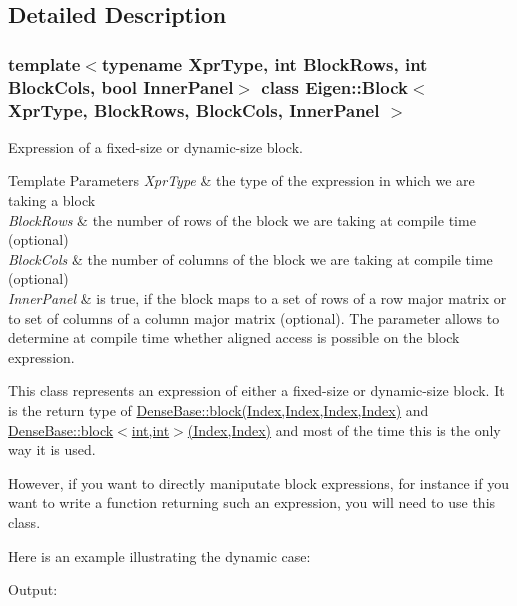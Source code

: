 \subsection{Detailed Description}
\subsubsection*{template$<$typename Xpr\+Type, int Block\+Rows, int Block\+Cols, bool Inner\+Panel$>$\newline
class Eigen\+::\+Block$<$ Xpr\+Type, Block\+Rows, Block\+Cols, Inner\+Panel $>$}

Expression of a fixed-\/size or dynamic-\/size block. 


\begin{DoxyTemplParams}{Template Parameters}
{\em Xpr\+Type} & the type of the expression in which we are taking a block \\
\hline
{\em Block\+Rows} & the number of rows of the block we are taking at compile time (optional) \\
\hline
{\em Block\+Cols} & the number of columns of the block we are taking at compile time (optional) \\
\hline
{\em Inner\+Panel} & is true, if the block maps to a set of rows of a row major matrix or to set of columns of a column major matrix (optional). The parameter allows to determine at compile time whether aligned access is possible on the block expression.\\
\hline
\end{DoxyTemplParams}
This class represents an expression of either a fixed-\/size or dynamic-\/size block. It is the return type of \mbox{\hyperlink{class_eigen_1_1_dense_base_ab8e42e67c5cfd5fa13e684642f0f65bf}{Dense\+Base\+::block(\+Index,\+Index,\+Index,\+Index)}} and \mbox{\hyperlink{class_eigen_1_1_dense_base_adfadb0b888358ae1f521cc0a106ddb85}{Dense\+Base\+::block$<$int,int$>$(\+Index,\+Index)}} and most of the time this is the only way it is used.

However, if you want to directly maniputate block expressions, for instance if you want to write a function returning such an expression, you will need to use this class.

Here is an example illustrating the dynamic case\+: 
\begin{DoxyCodeInclude}{0}
\end{DoxyCodeInclude}
 Output\+: 
\begin{DoxyVerbInclude}
\end{DoxyVerbInclude}


